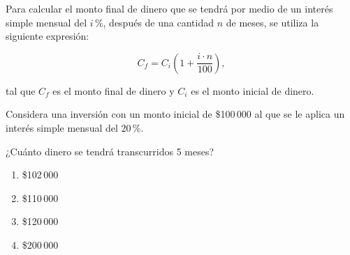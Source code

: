 \begin{problem}
    Para calcular el monto final de dinero que se tendrá por medio de un interés simple mensual del $i\,\%$, después de una cantidad $n$ de meses, se utiliza la siguiente expresión:

    \[
    C_f = C_i \left(1 + \frac{i \cdot n}{100}\right),
    \]

    tal que $C_f$ es el monto final de dinero y $C_i$ es el monto inicial de dinero.

    Considera una inversión con un monto inicial de \$100\,000 al que se le aplica un interés simple mensual del 20\,\%.

    ¿Cuánto dinero se tendrá transcurridos 5 meses?

    \begin{enumerate}[label=\Alph*.]
        \item \$102\,000
        \item \$110\,000
        \item \$120\,000
        \item \$200\,000
    \end{enumerate}
\end{problem}
